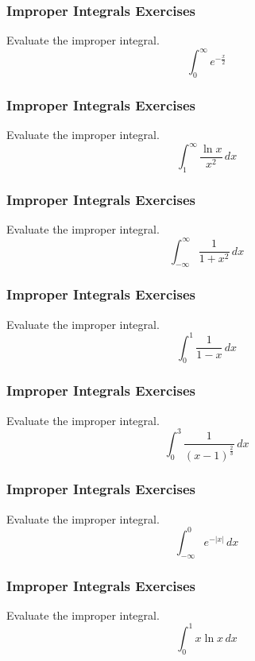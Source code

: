 \documentclass[xcolor=dvipsnames]{beamer}
\begin{document}
\begin{frame}
  \frametitle{Improper Integrals Exercises}
{\ubung} Evaluate the improper integral.
  \begin{equation}
    \label{eq:cheifiwo}
    \int_{0}^{\infty}e^{-\frac{x}{2}}
  \end{equation}
\end{frame}

\begin{frame}
  \frametitle{Improper Integrals Exercises}
{\ubung} Evaluate the improper integral.
  \begin{equation}
    \label{eq:eiquiena}
    \int_{1}^{\infty}\frac{\ln{}x}{x^{2}}\,dx
  \end{equation}
\end{frame}

\begin{frame}
  \frametitle{Improper Integrals Exercises}
{\ubung} Evaluate the improper integral.
  \begin{equation}
    \label{eq:yielohwi}
    \int_{-\infty}^{\infty}\frac{1}{1+x^{2}}\,dx
  \end{equation}
\end{frame}

\begin{frame}
  \frametitle{Improper Integrals Exercises}
{\ubung} Evaluate the improper integral.
  \begin{equation}
    \label{eq:oocoibuo}
    \int_{0}^{1}\frac{1}{1-x}\,dx
  \end{equation}
\end{frame}

\begin{frame}
  \frametitle{Improper Integrals Exercises}
{\ubung} Evaluate the improper integral.
  \begin{equation}
    \label{eq:eebaesie}
    \int_{0}^{3}\frac{1}{(x-1)^{\frac{2}{3}}}\,dx
  \end{equation}
\end{frame}

\begin{frame}
  \frametitle{Improper Integrals Exercises}
{\ubung} Evaluate the improper integral.
  \begin{equation}
    \label{eq:aezihuth}
    \int_{-\infty}^{0}e^{-|x|}\,dx
  \end{equation}
\end{frame}

\begin{frame}
  \frametitle{Improper Integrals Exercises}
{\ubung} Evaluate the improper integral.
  \begin{equation}
    \label{eq:wiexohje}
    \int_{0}^{1}x\ln{}x\,dx
  \end{equation}
\end{frame}
\end{document}
